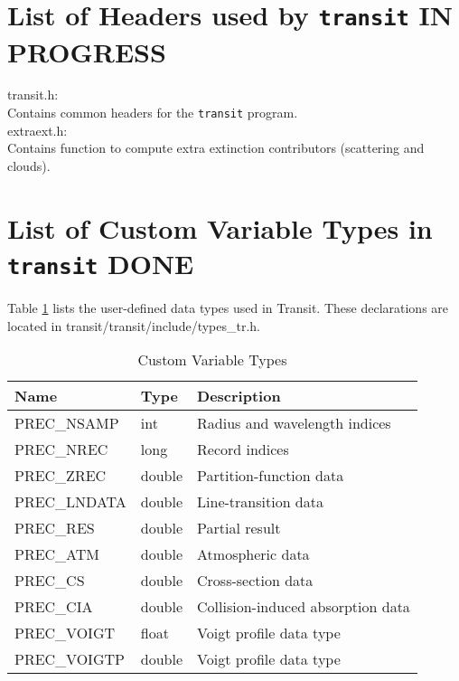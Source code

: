 \documentclass[letterpaper,12pt]{article}
\begin{document}
\section{List of Headers used by \texttt{transit} IN PROGRESS}

transit.h: \\
\indent Contains common headers for the \texttt{transit} program.\\
extraext.h: \\
\indent Contains function to compute extra extinction contributors (scattering and clouds).\\

	
\section{List of Custom Variable Types in \texttt{transit} DONE}

Table \ref{table:types} lists the user-defined data types used in
Transit.  These declarations are located in
transit/transit/include/types\_tr.h.

\begin{table}[ht]
\centering
\caption{Custom Variable Types}
\label{table:types}
\begin{tabular}{lll}
\hline
\hline
Name         & Type   & Description \\
\hline
PREC\_NSAMP  & int    &  Radius and wavelength indices \\
PREC\_NREC   & long   &  Record indices \\
PREC\_ZREC   & double &  Partition-function data \\
PREC\_LNDATA & double &  Line-transition data  \\
PREC\_RES    & double &  Partial result  \\
PREC\_ATM    & double &  Atmospheric data  \\
PREC\_CS     & double &  Cross-section data  \\
PREC\_CIA    & double &  Collision-induced absorption data  \\
PREC\_VOIGT  & float  & Voigt profile data type \\
PREC\_VOIGTP & double & Voigt profile data type \\
\hline
\end{tabular}
\end{table}

\newpage
\end{document}
